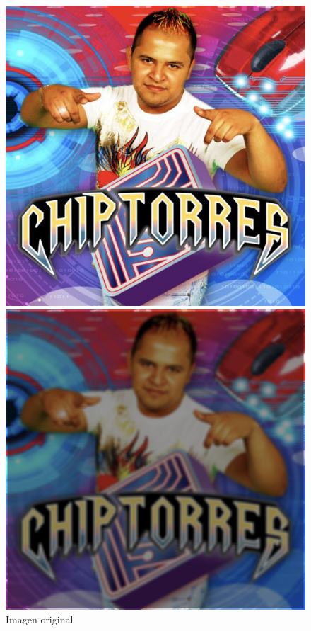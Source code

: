 \begin{figure}[H]
	\centering
	\begin{minipage}{.3\textwidth}
		\centering
		\includegraphics[width=\linewidth]{imgs/blur_original.jpg}
		\caption{Imagen original}
		\label{fig:blur_original}
	\end{minipage}\hfill
	\begin{minipage}{.3\textwidth}
		\centering
		\includegraphics[width=\linewidth]{imgs/blur_s3_r3.jpg}

\end{minipage}
\end{figure}
